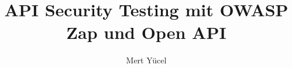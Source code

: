 \documentclass[fontsize=12pt,bachelor,german]{hgbthesis}
\title{API Security Testing mit OWASP Zap und Open API}
\author{Mert Yücel}
\begin{document}

\frontmatter                    %

\newpage\null\thispagestyle{empty}\newpage

\setcounter{page}{1}

\setcounter{secnumdepth}{4}
\setcounter{tocdepth}{2}
\tableofcontents
\listoffigures
\listoftables
\renewcommand{\lstlistlistingname}{Verzeichnis der Quellcodes}
\renewcommand{\lstlistingname}{Quellcode}
\lstlistoflistings
		

\mainmatter          %









\appendix                                            %

\MakeBibliography                        %



\end{document}
